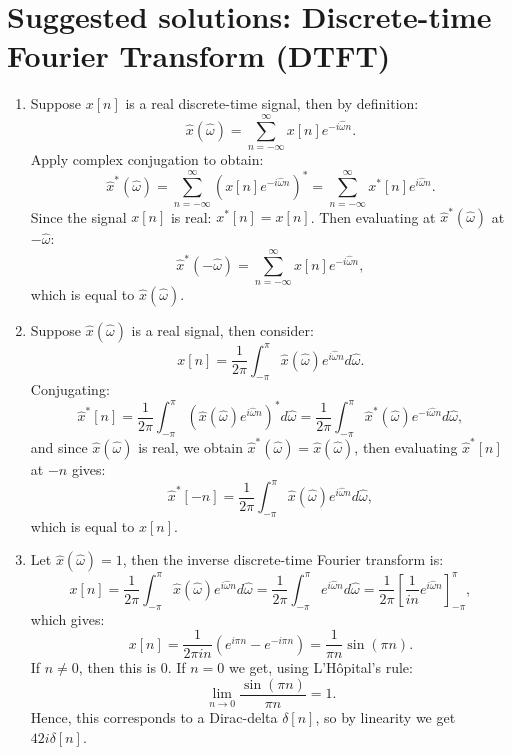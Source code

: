 
\newpage
\section{Suggested solutions: Discrete-time Fourier Transform (DTFT)}
\begin{enumerate}

  \item Suppose $x[n]$ is a real discrete-time signal, then by definition:
        \[ \hat{x}(\hat{\omega})=\sum_{n=-\infty}^{\infty}x[n]e^{-i\hat{\omega}n}. \]
        Apply complex conjugation to obtain:
        \[ \hat{x}^{*}(\hat{\omega})=\sum_{n=-\infty}^{\infty}(x[n]e^{-i\hat{\omega}n})^{*}=\sum_{n=-\infty}^{\infty}x^{*}[n]e^{i\hat{\omega}n}. \]
        Since the signal $x[n]$ is real: $x^{*}[n]=x[n]$. 
        Then evaluating at $\hat{x}^{*}(\hat{\omega})$ at $-\hat{\omega}$:
        \[ \hat{x}^{*}(-\hat{\omega})=\sum_{n=-\infty}^{\infty}x[n]e^{-i\hat{\omega}n}, \]
        which is equal to $\hat{x}(\hat{\omega})$.

  \item Suppose $\hat{x}(\hat{\omega})$ is a real signal, then consider:
        \[ x[n]=\frac{1}{2\pi}\int_{-\pi}^{\pi}\hat{x}(\hat{\omega})e^{i\hat{\omega}n}d\hat{\omega}. \]
        Conjugating:
        \[ \hat{x}^{*}[n]=\frac{1}{2\pi}\int_{-\pi}^{\pi}(\hat{x}(\hat{\omega})e^{i\hat{\omega}n})^{*}d\hat{\omega}=\frac{1}{2\pi}\int_{-\pi}^{\pi}\hat{x}^{*}(\hat{\omega})e^{-i\hat{\omega}n}d\hat{\omega}, \]
        and since $\hat{x}(\hat{\omega})$ is real, we obtain $\hat{x}^{*}(\hat{\omega})=\hat{x}(\hat{\omega})$, 
        then evaluating $\hat{x}^{*}[n]$ at $-n$ gives:
        \[ \hat{x}^{*}[-n]=\frac{1}{2\pi}\int_{-\pi}^{\pi}\hat{x}(\hat{\omega})e^{i\hat{\omega}n}d\hat{\omega}, \]
        which is equal to $x[n]$.

  \item Let $\hat{x}(\hat{\omega})=1$, then the inverse discrete-time Fourier transform is:
        \[ x[n]=\frac{1}{2\pi}\int_{-\pi}^{\pi}\hat{x}(\hat{\omega})e^{i\hat{\omega}n}d\hat{\omega}=\frac{1}{2\pi}\int_{-\pi}^{\pi}e^{i\hat{\omega}n}d\hat{\omega}=\frac{1}{2\pi}\left[\frac{1}{in}e^{i\hat{\omega}n}\right]_{-\pi}^{\pi}, \]
        which gives:
        \[ x[n]=\frac{1}{2\pi in}(e^{i\pi n}-e^{-i\pi n})=\frac{1}{\pi n}\sin(\pi n). \]
        If $n\neq 0$, then this is $0$. If $n=0$ we get, using L'Hôpital's rule:
        \[ \lim_{n\to 0}\frac{\sin(\pi n)}{\pi n}=1. \]
        Hence, this corresponds to a Dirac-delta $\delta[n]$, so by linearity we get $42i\delta[n]$.


\end{enumerate}
